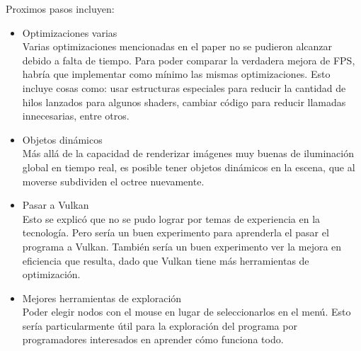 Proximos pasos incluyen:
\begin{itemize}
    \item Optimizaciones varias\\
        Varias optimizaciones mencionadas en el paper no se pudieron alcanzar debido a falta de tiempo. Para poder comparar la verdadera mejora de FPS, habría que implementar como mínimo las mismas optimizaciones. Esto incluye cosas como: usar estructuras especiales para reducir la cantidad de hilos lanzados para algunos shaders, cambiar código para reducir llamadas innecesarias, entre otros.
    \item Objetos dinámicos\\ %
        Más allá de la capacidad de renderizar imágenes muy buenas de iluminación global en tiempo real, es posible tener objetos dinámicos en la escena, que al moverse subdividen el octree nuevamente.
    \item Pasar a Vulkan\\
        Esto se explicó que no se pudo lograr por temas de experiencia en la tecnología. Pero sería un buen experimento para aprenderla el pasar el programa a Vulkan. También sería un buen experimento ver la mejora en eficiencia que resulta, dado que Vulkan tiene más herramientas de optimización.
    \item Mejores herramientas de exploración\\
        Poder elegir nodos con el mouse en lugar de seleccionarlos en el menú. Esto sería particularmente útil para la exploración del programa por programadores interesados en aprender cómo funciona todo.
\end{itemize}


